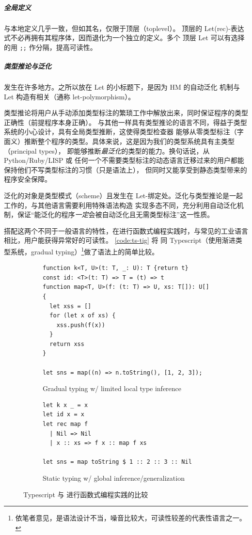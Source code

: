 \documentclass[a4paper, 11pt]{article}
\theoremstyle{remark}\newtheorem*{remark}{Remark}
\theoremstyle{definition}\newtheorem*{definition}{Definition}
\begin{document}
\subparagraph*{全局定义} 与本地定义几乎一致，但如其名，仅限于顶层（toplevel）。
顶层的 Let(rec)-表达式不必再拥有其程序体，因而退化为一个独立的定义。多个
顶层 Let 可以有选择的用 \texttt{;;} 作分隔，提高可读性。

\subparagraph*{类型推论与泛化} 发生在许多地方。之所以放在 Let 的小标题下，是因为 HM 的自动泛化
机制与 Let 构造有相关（通称 let-polymorphism）。

类型推论将用户从手动添加类型标注的繁琐工作中解放出来，同时保证程序的类型正确性（前提程序本身正确）。
与其他一样具有类型推论的语言不同，得益于类型系统的小心设计，\Tigris 具有全局类型推断，这使得类型检查器
能够从零类型标注（字面义）推断整个程序的类型。具体来说，这是因为我们的类型系统具有主类型（principal types），
即能够推断\emph{最泛化}的类型的能力。换句话说，从 Python/Ruby/LISP 或
任何一个不需要类型标注的动态语言迁移过来的用户都能保持他们不写类型标注的习惯（只是语法上），
但同时又能享受到静态类型带来的程序安全保障。

泛化的对象是类型模式（scheme）且发生在 Let-绑定处。泛化与类型推论是一起工作的，与其他语言需要利用特殊语法构造
实现多态不同，\Tigris 充分利用自动泛化机制，保证“能泛化的程序\emph{一定}会被自动泛化且无需类型标注”这一性质。

搭配这两个不同于一般语言的特性，在进行函数式编程实践时，与常见的工业语言相比，用户能获得异常好的可读性。
\autoref{code:ts-tig} 将 \Tigris 同 Typescript（使用渐进类型系统，gradual typing）\footnote{
  依笔者意见，是语法设计不当，噪音比较大，可读性较差的代表性语言之一。
}做了语法上的简单比较。

\begin{figure}\centering
  \begin{subfigure}{0.6\textwidth}\centering
    \begin{verbatim}
function k<T, U>(t: T, _: U): T {return t}
const id: <T>(t: T) => T = (t) => t
function map<T, U>(f: (t: T) => U, xs: T[]): U[] {
  let xss = []
  for (let x of xs) {
    xss.push(f(x))
  }
  return xss
}

let sns = map((n) => n.toString(), [1, 2, 3]);
    \end{verbatim}
    \caption{Gradual typing w/ limited local type inference}
  \end{subfigure}%
  \begin{subfigure}{0.5\textwidth}\centering
    \begin{verbatim}
let k x _ = x
let id x = x
let rec map f
  | Nil => Nil
  | x :: xs => f x :: map f xs

let sns = map toString $ 1 :: 2 :: 3 :: Nil
    \end{verbatim}
    \caption{Static typing w/ global inference/generalization}
  \end{subfigure}
  \caption{Typescript 与 \Tigris 进行函数式编程实践的比较}\label{code:ts-tig}
\end{figure}
\end{document}
